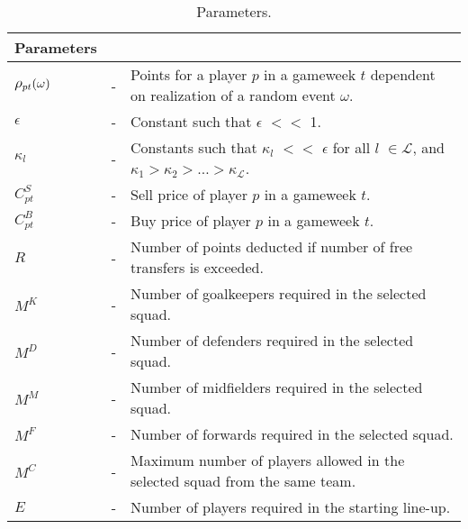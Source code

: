 \begin{table}[H]
\tabcolsep=0.11cm
\centering
\caption{Parameters.}
\begin{tabular}{@{}lll@{}}
\toprule
Parameters                       &   &                                                                                                \\ \midrule
$\mathlarger{\rho_{pt}(\omega)}$ & - & Points for a player $p$ in a gameweek $t$ dependent on realization of a random event $\omega$. \\
$\epsilon$                       & - & Constant such that $\epsilon$ $<<$ 1.                                                                     \\
$\kappa_{l}$                     & - & Constants such that $\kappa_{l}$ $<<$ $\epsilon$ for all $l$ $\in \mathcal{L}$, and $\kappa_{1} > \kappa_{2} > \ldots > \kappa_{\mathcal{L}}$.                                               \\
$C_{pt}^{S}$                     & - & Sell price of player $p$ in a gameweek $t$.                                                    \\
$C_{pt}^{B}$                     & - & Buy price of player $p$ in a gameweek $t$.                                                     \\
$R$                              & - & Number of points deducted if number of free transfers is exceeded.        \\
$M^{K}$                          & - & Number of goalkeepers required in the selected squad.                                           \\
$M^{D}$                          & - & Number of defenders required in the selected squad.                                             \\
$M^{M}$                          & - & Number of midfielders required in the selected squad.                                           \\
$M^{F}$                          & - & Number of forwards required in the selected squad.                                              \\
$M^{C}$                          & - & Maximum number of players allowed in the selected squad from the same team.                                         \\
$E$                              & - & Number of players required in the starting line-up.                                               \\

\end{tabular}
\end{table}

